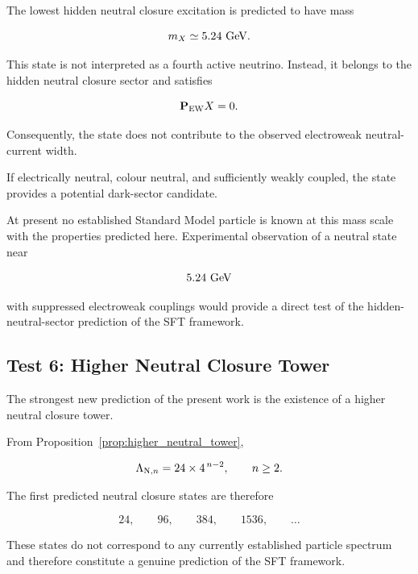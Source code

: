 \documentclass[11pt]{article}
\theoremstyle{definition}
\theoremstyle{remark}
\begin{document}
The lowest hidden neutral closure excitation is predicted to
have mass

\begin{equation}
m_X
\simeq
5.24~{\rm GeV}.
\end{equation}

This state is not interpreted as a fourth active neutrino.
Instead, it belongs to the hidden neutral closure sector and
satisfies

\begin{equation}
\mathbf P_{\rm EW}X=0.
\end{equation}

Consequently, the state does not contribute to the observed
electroweak neutral-current width.

If electrically neutral, colour neutral, and sufficiently
weakly coupled, the state provides a potential dark-sector
candidate.

At present no established Standard Model particle is known at
this mass scale with the properties predicted here.
Experimental observation of a neutral state near

\[
5.24~{\rm GeV}
\]

with suppressed electroweak couplings would provide a direct
test of the hidden-neutral-sector prediction of the SFT
framework.


\subsection{Test 6: Higher Neutral Closure Tower}

The strongest new prediction of the present work is the
existence of a higher neutral closure tower.

From Proposition~\ref{prop:higher_neutral_tower},

\begin{equation}
\Lambda_{{\rm N},n}
=
24\times4^{\,n-2},
\qquad
n\geq2.
\end{equation}

The first predicted neutral closure states are therefore

\begin{equation}
24,
\qquad
96,
\qquad
384,
\qquad
1536,
\qquad
\ldots
\end{equation}

These states do not correspond to any currently established
particle spectrum and therefore constitute a genuine prediction
of the SFT framework.
\end{document}

